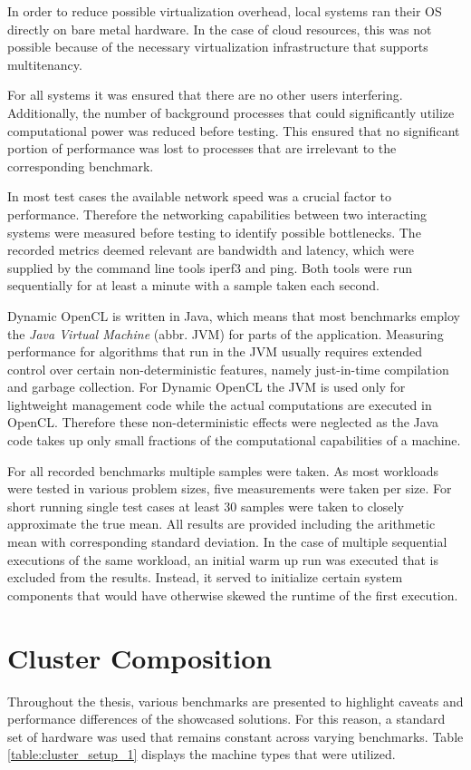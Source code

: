 In order to reduce possible virtualization overhead, local systems ran their OS directly on bare metal hardware. In the case of cloud resources, this was not possible because of the necessary virtualization infrastructure that supports multitenancy.

For all systems it was ensured that there are no other users interfering. Additionally, the number of background processes that could significantly utilize computational power was reduced before testing. This ensured that no significant portion of performance was lost to processes that are irrelevant to the corresponding benchmark.

In most test cases the available network speed was a crucial factor to performance. Therefore the networking capabilities between two interacting systems were measured before testing to identify possible bottlenecks. The recorded metrics deemed relevant are bandwidth and latency, which were supplied by the command line tools iperf3 and ping. Both tools were run sequentially for at least a minute with a sample taken each second.

Dynamic OpenCL is written in Java, which means that most benchmarks employ the \textit{Java Virtual Machine} (abbr. JVM) for parts of the application. Measuring performance for algorithms that run in the JVM usually requires extended control over certain non-deterministic features, namely just-in-time compilation and garbage collection\cite{rigorous_java}. For Dynamic OpenCL the JVM is used only for lightweight management code while the actual computations are executed in OpenCL. Therefore these non-deterministic effects were neglected as the Java code takes up only small fractions of the computational capabilities of a machine.

For all recorded benchmarks multiple samples were taken. As most workloads were tested in various problem sizes, five measurements were taken per size. For short running single test cases at least 30 samples were taken to closely approximate the true mean\cite{measuring_computer_performance}. All results are provided including the arithmetic mean with corresponding standard deviation. In the case of multiple sequential executions of the same workload, an initial warm up run was executed that is excluded from the results. Instead, it served to initialize certain system components that would have otherwise skewed the runtime of the first execution.

\section{Cluster Composition}
\label{cluster_composition}
Throughout the thesis, various benchmarks are presented to highlight caveats and performance differences of the showcased solutions. For this reason, a standard set of hardware was used that remains constant across varying benchmarks. Table \ref{table:cluster_setup_1} displays the machine types that were utilized.

